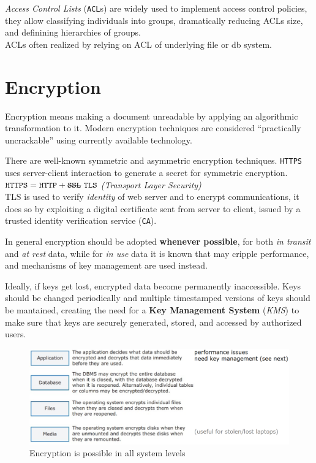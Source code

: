 \textit{Access Control Lists} (\texttt{ACL}s) are widely used to implement access control policies,
they allow
classifying individuals into groups, dramatically reducing ACLs size,
and definining hierarchies of groups.\\
ACLs often realized by relying on ACL of underlying file or db
system.

\section{Encryption}

Encryption means making a document unreadable by applying an algorithmic transformation to it.
Modern encryption techniques are considered “practically uncrackable”
using currently available technology.

There are well-known symmetric and asymmetric encryption techniques.
\texttt{HTTPS} uses server-client interaction to generate a secret for symmetric encryption.\\
$\texttt{HTTPS} = \texttt{HTTP} + \st{\texttt{SSL}}\ \texttt{TLS}$ \textit{(Transport Layer Security)}\\
TLS is used to verify \textit{identity} of web server and to encrypt communications,
it does so by exploiting a digital certificate sent from server to client, issued by a trusted identity verification service (\texttt{CA}).

In general encryption should be adopted \textbf{whenever possible},
for both \textit{in transit} and \textit{at rest} data,
while for \textit{in use} data it is known that may cripple performance, 
and mechanisms of key management are used instead.

Ideally, if keys get lost, encrypted data become permanently inaccessible.
Keys should be changed periodically and multiple timestamped versions of keys should be mantained,
creating the need for a \textbf{Key Management System}
(\textit{KMS}) to make sure that keys are securely generated, stored, and accessed by authorized users.

\begin{figure}[htbp]
   \centering
   \includegraphics{images/encryption.png}
   \caption{Encryption is possible in all system levels}
   \label{fig:encryption}
\end{figure}

